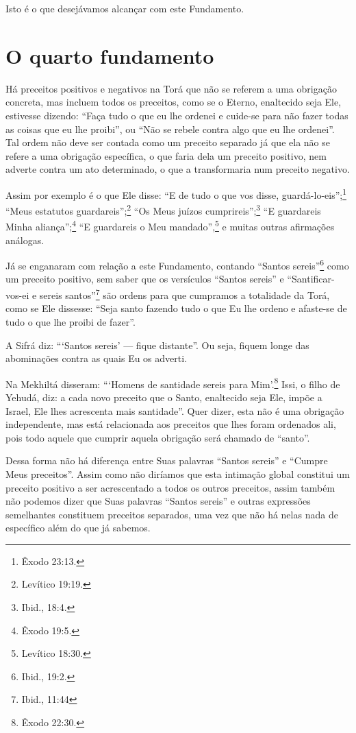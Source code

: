 Isto é o que desejávamos alcançar com este Fundamento.

\chapter*{O quarto fundamento}

Há preceitos positivos e negativos na Torá que não se referem a uma
obrigação concreta, mas incluem todos os preceitos, como se o Eterno,
enaltecido seja Ele, estivesse dizendo: ``Faça tudo o que eu lhe ordenei
e cuide-se para não fazer todas as coisas que eu lhe proibi'', ou ``Não
se rebele contra algo que eu lhe ordenei''. Tal ordem não deve ser
contada como um preceito separado já que ela não se refere a uma
obrigação específica, o que faria dela um preceito positivo, nem adverte
contra um ato determinado, o que a transformaria num preceito negativo.

Assim por exemplo é o que Ele disse: ``E de tudo o que vos disse,
guardá-lo-eis'';\footnote{Êxodo 23:13.} ``Meus estatutos guardareis'';\footnote{Levítico
19:19.} ``Os Meus juízos cumprireis'';\footnote{Ibid., 18:4.} ``E guardareis
Minha aliança'';\footnote{Êxodo 19:5.} ``E guardareis o Meu mandado'',\footnote{Levítico
18:30.} e muitas outras afirmações análogas.

Já se enganaram com relação a este Fundamento, contando ``Santos
sereis''\footnote{Ibid., 19:2.} como um preceito positivo, sem saber que os
versículos
``Santos sereis'' e ``Santificar-vos-ei e sereis santos''\footnote{Ibid., 11:44}
são ordens para que cumpramos a totalidade da Torá, como se Ele
dissesse: ``Seja santo fazendo tudo o que Eu lhe ordeno e afaste-se de
tudo o que lhe proibi de fazer''.

A Sifrá diz: ```Santos sereis' --- fique distante''. Ou seja, fiquem
longe das abominações contra as quais Eu os adverti.

Na Mekhiltá disseram: ```Homens de santidade sereis para Mim'.\footnote{Êxodo
22:30.} Issi, o filho de Yehudá, diz: a cada novo preceito que o Santo,
enaltecido seja Ele, impõe a Israel, Ele lhes acrescenta mais
santidade''. Quer dizer, esta não é uma obrigação independente, mas está
relacionada aos preceitos que lhes foram ordenados ali, pois todo aquele
que cumprir aquela obrigação será chamado de ``santo''.

Dessa forma não há diferença entre Suas palavras ``Santos sereis'' e
``Cumpre Meus preceitos''. Assim como não diríamos que esta intimação
global constitui um preceito positivo a ser acrescentado a todos os
outros preceitos, assim também não podemos dizer que Suas palavras
``Santos sereis'' e outras expressões semelhantes constituem preceitos
separados, uma vez que não há nelas nada de específico além do que já
sabemos.

